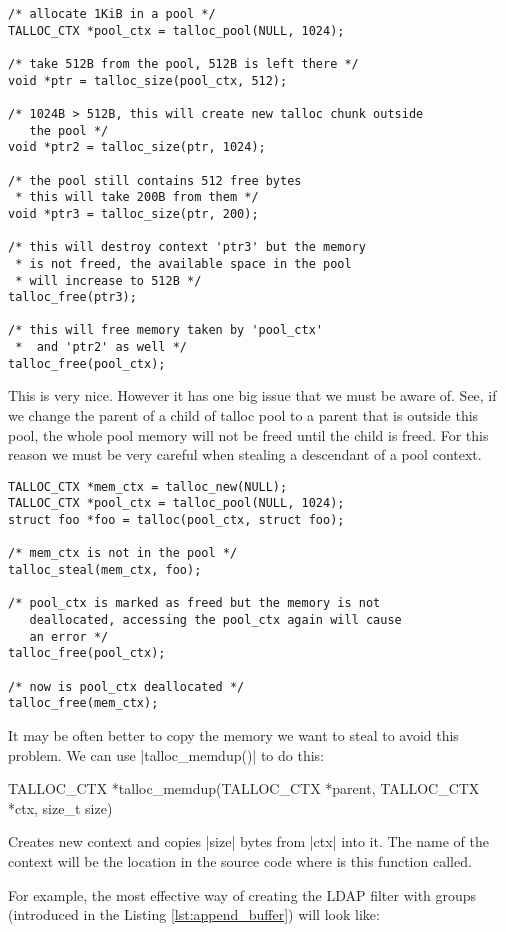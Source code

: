 \begin{lstlisting}[caption={Talloc pool},label=lst:talloc_pool,
morekeywords={talloc_pool}]
/* allocate 1KiB in a pool */
TALLOC_CTX *pool_ctx = talloc_pool(NULL, 1024);

/* take 512B from the pool, 512B is left there */
void *ptr = talloc_size(pool_ctx, 512);

/* 1024B > 512B, this will create new talloc chunk outside
   the pool */
void *ptr2 = talloc_size(ptr, 1024);

/* the pool still contains 512 free bytes
 * this will take 200B from them */
void *ptr3 = talloc_size(ptr, 200);

/* this will destroy context 'ptr3' but the memory
 * is not freed, the available space in the pool
 * will increase to 512B */
talloc_free(ptr3);

/* this will free memory taken by 'pool_ctx'
 *  and 'ptr2' as well */
talloc_free(pool_ctx);
\end{lstlisting}

\noindent
This is very nice. However it has one big issue that we must be aware of. See,
if we change the parent of a child of talloc pool to a parent that is outside
this pool, the whole pool memory will not be freed until the child is freed.
For this reason we must be very careful when stealing a descendant of a pool
context.

\begin{lstlisting}[caption={Stealing from pool context},
morekeywords={talloc_pool,talloc_steal,talloc_free}]
TALLOC_CTX *mem_ctx = talloc_new(NULL);
TALLOC_CTX *pool_ctx = talloc_pool(NULL, 1024);
struct foo *foo = talloc(pool_ctx, struct foo);

/* mem_ctx is not in the pool */
talloc_steal(mem_ctx, foo);

/* pool_ctx is marked as freed but the memory is not
   deallocated, accessing the pool_ctx again will cause
   an error */
talloc_free(pool_ctx);

/* now is pool_ctx deallocated */
talloc_free(mem_ctx);
\end{lstlisting}

\noindent
It may be often better to copy the memory we want to steal to avoid this
problem. We can use |talloc_memdup()| to do this:

\begin{funcproto}
TALLOC_CTX *talloc_memdup(TALLOC_CTX *parent,
                          TALLOC_CTX *ctx, size_t size)
\end{funcproto}
\begin{funcdesc}
Creates new context and copies |size| bytes from |ctx| into it. The name of the
context will be the location in the source code where is this function called.
\end{funcdesc}
\funclistend
For example, the most effective way of creating the LDAP filter with groups
(introduced in the Listing \ref{lst:append_buffer}) will look like:

